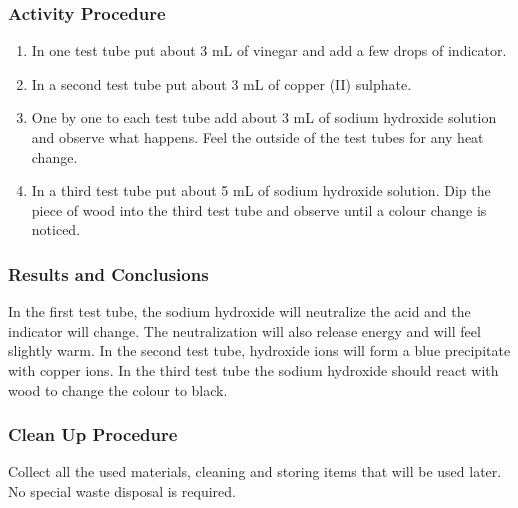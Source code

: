 \subsubsection*{Activity Procedure}
\begin{enumerate}
\item{In one test tube put about 3 mL of vinegar and add a few drops of indicator.}
\item{In a second test tube put about 3 mL of copper (II) sulphate.}
\item{One by one to each test tube add about 3 mL of sodium hydroxide solution and observe what happens. Feel the outside of the test tubes for any heat change.}
\item{In a third test tube put about 5 mL of sodium hydroxide solution. Dip the piece of wood into the third test tube and observe until a colour change is noticed.}
\end{enumerate}

\subsubsection*{Results and Conclusions}
In the first test tube, the sodium hydroxide will neutralize the acid and the indicator will change. The neutralization will also release energy and will feel slightly warm.
In the second test tube, hydroxide ions will form a blue precipitate with copper ions.
In the third test tube the sodium hydroxide should react with wood to change the colour to black.

\subsubsection*{Clean Up Procedure}
Collect all the used materials, cleaning and storing items that will be used later.  No special waste disposal is required.
